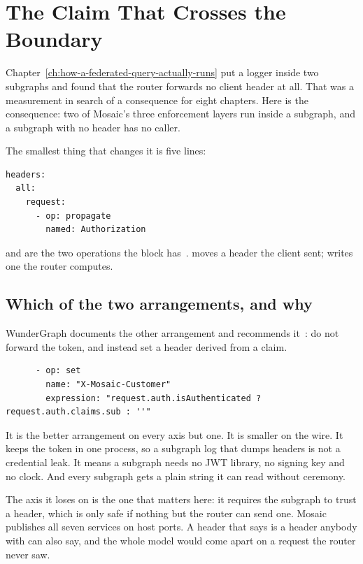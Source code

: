 \section{The Claim That Crosses the Boundary}
\label{sec:ch15-the-claim-that-crosses}
%

Chapter~\ref{ch:how-a-federated-query-actually-runs} put a logger inside two
subgraphs and found that the router forwards no client header at all. That was a
measurement in search of a consequence for eight chapters. Here is the
consequence: two of Mosaic's three enforcement layers run inside a subgraph, and
a subgraph with no header has no caller.

The smallest thing that changes it is five lines:

\begin{verbatim}
headers:
  all:
    request:
      - op: propagate
        named: Authorization
\end{verbatim}

 and  are the two operations the block
has~\autocite{cosmodocs2026headers}.  moves a header the client
sent;  writes one the router computes.

\subsection*{Which of the two arrangements, and why}

%
WunderGraph documents the other arrangement and recommends
it~\autocite{cosmodocs2026headers}: do not forward the token, and instead set a
header derived from a claim.

\begin{verbatim}
      - op: set
        name: "X-Mosaic-Customer"
        expression: "request.auth.isAuthenticated ? request.auth.claims.sub : ''"
\end{verbatim}

It is the better arrangement on every axis but one. It is smaller on the wire.
It keeps the token in one process, so a subgraph log that dumps headers is not a
credential leak. It means a subgraph needs no JWT library, no signing key and no
clock. And every subgraph gets a plain string it can read without ceremony.

The axis it loses on is the one that matters here: it requires the subgraph to
trust a header, which is only safe if nothing but the router can send one.
Mosaic publishes all seven services on host ports. A header that says
 is a header anybody with  can also say, and
the whole model would come apart on a request the router never saw.

